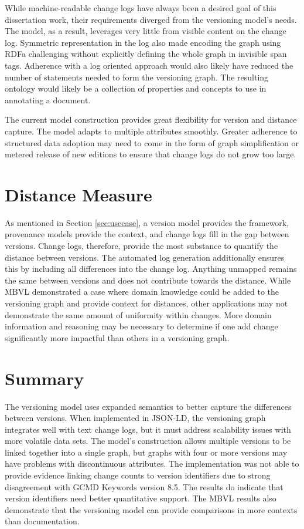 While machine-readable change logs have always been a desired goal of this dissertation work, their requirements diverged from the versioning model's needs.
The model, as a result, leverages very little from visible content on the change log.
Symmetric representation in the log also made encoding the graph using RDFa challenging without explicitly defining the whole graph in invisible span tags.
Adherence with a log oriented approach would also likely have reduced the number of statements needed to form the versioning graph.
The resulting ontology would likely be a collection of properties and concepts to use in annotating a document.

The current model construction provides great flexibility for version and distance capture.
The model adapts to multiple attributes smoothly.
Greater adherence to structured data adoption may need to come in the form of graph simplification or metered release of new editions to ensure that change logs do not grow too large.

\section{Distance Measure}

As mentioned in Section \ref{sec:usecase}, a version model provides the framework, provenance models provide the context, and change logs fill in the gap between versions.
Change logs, therefore, provide the most substance to quantify the distance between versions.
The automated log generation additionally ensures this by including all differences into the change log.
Anything unmapped remains the same between versions and does not contribute towards the distance.
While MBVL demonstrated a case where domain knowledge could be added to the versioning graph and provide context for distances, other applications may not demonstrate the same amount of uniformity within changes.
More domain information and reasoning may be necessary to determine if one add change significantly more impactful than others in a versioning graph.

\section{Summary}

The versioning model uses expanded semantics to better capture the differences between versions.
When implemented in JSON-LD, the versioning graph integrates well with text change logs, but it must address scalability issues with more volatile data sets.
The model's construction allows multiple versions to be linked together into a single graph, but graphs with four or more versions may have problems with discontinuous attributes.
The implementation was not able to provide evidence linking change counts to version identifiers due to strong disagreement with GCMD Keywords version 8.5.
The results do indicate that version identifiers need better quantitative support.
The MBVL results also demonstrate that the versioning model can provide comparisons in more contexts than documentation.
